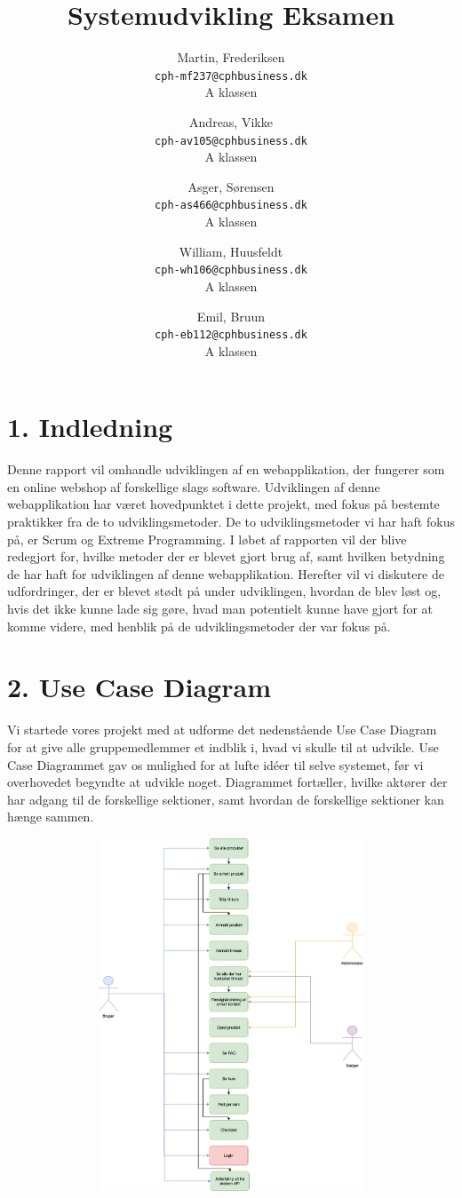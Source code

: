 \documentclass[11pt]{report}
\title{Systemudvikling Eksamen}
\author{
  Martin, Frederiksen\\
  \texttt{cph-mf237@cphbusiness.dk}\\
  A klassen
  \and
  Andreas, Vikke\\
  \texttt{cph-av105@cphbusiness.dk}\\
  A klassen
  \and
  Asger, Sørensen\\
  \texttt{cph-as466@cphbusiness.dk}\\
  A klassen
  \and
  William, Huusfeldt\\
  \texttt{cph-wh106@cphbusiness.dk}\\
  A klassen
  \and
  Emil, Bruun\\
  \texttt{cph-eb112@cphbusiness.dk}\\
  A klassen
}
\date{}
\begin{document}
\maketitle

\renewcommand{\cftchapleader}{\cftdotfill{\cftdotsep}}
\tableofcontents
\newpage

\chapter*{1. Indledning}
Denne rapport vil omhandle udviklingen af en webapplikation, der fungerer som en online webshop af forskellige slags software. Udviklingen af denne webapplikation har været hovedpunktet i dette projekt, med fokus på bestemte praktikker fra de to udviklingsmetoder. De to udviklingsmetoder vi har haft fokus på, er Scrum og Extreme Programming. I løbet af rapporten vil der blive redegjort for, hvilke metoder der er blevet gjort brug af, samt hvilken betydning de har haft for udviklingen af denne webapplikation. Herefter vil vi  diskutere de udfordringer, der er blevet stødt på under udviklingen, hvordan de blev løst og, hvis det ikke kunne lade sig gøre, hvad man potentielt kunne have gjort for at komme videre, med henblik på de udviklingsmetoder der var fokus på.


\chapter*{2. Use Case Diagram}
Vi startede vores projekt med at udforme det nedenstående Use Case Diagram for at give alle gruppemedlemmer et indblik i, hvad vi skulle til at udvikle. Use Case Diagrammet gav os mulighed for at lufte idéer til selve systemet, før vi overhovedet begyndte at udvikle noget. Diagrammet fortæller, hvilke aktører der har adgang til de forskellige sektioner, samt hvordan de forskellige sektioner kan hænge sammen.

\begin{center}
\includegraphics[height=10.5cm, width=15cm]{UseCaseDiagram}
\end{center}
\end{document}
